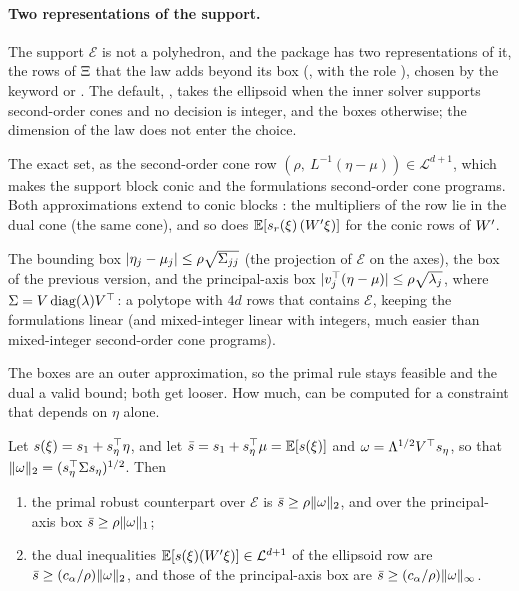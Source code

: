\paragraph{Two representations of the support.}
The support $\mathcal{E}$ is not a polyhedron, and the package has two representations of it, the rows of $\Xi$ that the law adds beyond its box
(, with the role ), chosen by the keyword  or .
The default, , takes the ellipsoid when the inner solver supports second-order cones and no decision is integer, and the boxes otherwise;
the dimension of the law does not enter the choice.
\begin{description}[nosep]
\item[Ellipsoid.] The exact set, as the second-order cone row $(\rho,\ L^{-1}(\eta - \mu)) \in \mathcal{L}^{d+1}$,
which makes the support block conic and the formulations second-order cone programs.
Both approximations extend to conic blocks \citep[Theorem~2.1]{GWK2015}:
the multipliers of the row lie in the dual cone (the same cone), and so does $\mathbb{E}[s_r(\xi)\,(W'\xi)]$ for the conic rows of $W'$.
\item[Boxes.] The bounding box $\lvert \eta_j - \mu_j \rvert \le \rho\sqrt{\Sigma_{jj}}$ (the projection of $\mathcal{E}$ on the axes), the box of the previous version,
and the principal-axis box $\lvert v_j^\top(\eta - \mu) \rvert \le \rho\sqrt{\lambda_j}$, where $\Sigma = V\operatorname{diag}(\lambda)V^\top$:
a polytope with $4d$ rows that contains $\mathcal{E}$, keeping the formulations linear (and mixed-integer linear with integers, much easier than mixed-integer second-order cone programs).
\end{description}
The boxes are an outer approximation, so the primal rule stays feasible and the dual a valid bound; both get looser.
How much, can be computed for a constraint that depends on $\eta$ alone.

\begin{proposition}
\label{prop:ellipsoid-box}
Let $s(\xi) = s_1 + s_\eta^\top\eta$, and let $\bar s = s_1 + s_\eta^\top\mu = \mathbb{E}[s(\xi)]$ and $\omega = \Lambda^{1/2}V^\top s_\eta$, so that $\lVert \omega \rVert_2 = (s_\eta^\top\Sigma s_\eta)^{1/2}$.
Then
\begin{enumerate}[label=(\alph*),nosep]
\item the primal robust counterpart over $\mathcal{E}$ is $\bar s \ge \rho\lVert \omega \rVert_2$, and over the principal-axis box $\bar s \ge \rho\lVert \omega \rVert_1$;
\item the dual inequalities $\mathbb{E}[s(\xi)(W'\xi)] \in \mathcal{L}^{d+1}$ of the ellipsoid row are $\bar s \ge (c_\alpha/\rho)\lVert \omega \rVert_2$,
and those of the principal-axis box are $\bar s \ge (c_\alpha/\rho)\lVert \omega \rVert_\infty$.
\end{enumerate}
\end{proposition}

